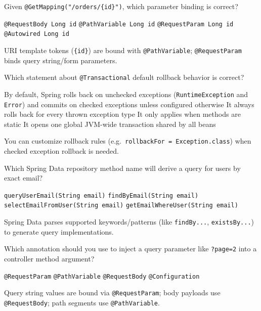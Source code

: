 \question[4]
Given \texttt{@GetMapping("/orders/\{id\}")}, which parameter binding is correct?
\begin{choices}
  \choice \texttt{@RequestBody Long id}
  \CorrectChoice \texttt{@PathVariable Long id}
  \choice \texttt{@RequestParam Long id}
  \choice \texttt{@Autowired Long id}
\end{choices}
\begin{solution}
  URI template tokens (\texttt{\{id\}}) are bound with \texttt{@PathVariable}; \texttt{@RequestParam} binds query string/form parameters.
\end{solution}

\question[4]
Which statement about \texttt{@Transactional} default rollback behavior is correct?
\begin{choices}
  \CorrectChoice By default, Spring rolls back on unchecked exceptions (\texttt{RuntimeException} and \texttt{Error}) and commits on checked exceptions unless configured otherwise
  \choice It always rolls back for every thrown exception type
  \choice It only applies when methods are static
  \choice It opens one global JVM-wide transaction shared by all beans
\end{choices}
\begin{solution}
  You can customize rollback rules (e.g.\ \texttt{rollbackFor = Exception.class}) when checked exception rollback is needed.
\end{solution}

\question[4]
Which Spring Data repository method name will derive a query for users by exact email?
\begin{choices}
  \choice \texttt{queryUserEmail(String email)}
  \CorrectChoice \texttt{findByEmail(String email)}
  \choice \texttt{selectEmailFromUser(String email)}
  \choice \texttt{getEmailWhereUser(String email)}
\end{choices}
\begin{solution}
  Spring Data parses supported keywords/patterns (like \texttt{findBy...}, \texttt{existsBy...}) to generate query implementations.
\end{solution}

\question[4]
Which annotation should you use to inject a query parameter like \texttt{?page=2} into a controller method argument?
\begin{choices}
  \CorrectChoice \texttt{@RequestParam}
  \choice \texttt{@PathVariable}
  \choice \texttt{@RequestBody}
  \choice \texttt{@Configuration}
\end{choices}
\begin{solution}
  Query string values are bound via \texttt{@RequestParam}; body payloads use \texttt{@RequestBody}; path segments use \texttt{@PathVariable}.
\end{solution}

